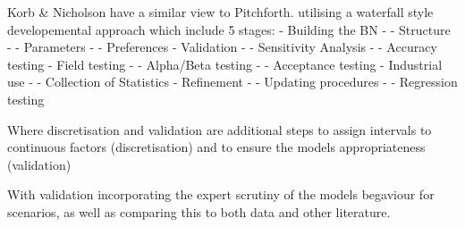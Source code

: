 Korb & Nicholson have a similar view to Pitchforth. utilising a waterfall style developemental approach which include 5 stages:
- Building the BN
-       - Structure
-       - Parameters
-       - Preferences
- Validation
-       - Sensitivity Analysis
-       - Accuracy testing
- Field testing
-       - Alpha/Beta testing
-       - Acceptance testing
- Industrial use
-       - Collection of Statistics
- Refinement
-       - Updating procedures
-       - Regression testing



Where discretisation and validation are additional steps to assign intervals to continuous factors (discretisation) and to ensure the models appropriateness (validation)

With validation incorporating the expert scrutiny of the models begaviour for scenarios, as well as comparing this to both data and other literature.



\citep{korbBayesianArtificialIntelligence2011}













